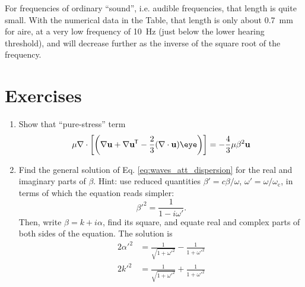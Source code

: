 For frequencies of ordinary ``sound'', i.e. audible frequencies, that
length is quite small. With the numerical data in the Table, that
length is only about \SI{0.7}{\milli\meter} for aire, at a very low
frequency of \SI{10}{\hertz} (just below the lower hearing threshold),
and will decrease further as the inverse of the square root of the
frequency.



\section{Exercises}
\begin{enumerate}
\item  \label{ex:div_of_traceless} Show that ``pure-stress'' term
  \[
   \mu \nabla \cdot \left[ \left(
        \nabla\bfu + \nabla\bfu\tran  - \frac23 (\divu)  \eye
      \right)
    \right] = -\frac43 \mu \beta^2 \bfu
  \]

\item Find the general solution of Eq. \ref{eq:waves_att_dispersion}
  for the real and imaginary parts of $\beta$. Hint: use reduced
  quantities $\beta'= c\beta/\omega $,
  $\omega'=\omega/\omega_\mathrm{c}$, in terms of which the equation
  reads simpler:
  \[
    \beta'^2 = \frac{1}{1-i \omega'} .
  \]
  Then, write $\beta=k+i \alpha$, find its square, and equate real and
  complex parts of both sides of the equation.
  The solution is
  \[
    \begin{align}
      2\alpha'^2 &=\frac {1}{\sqrt{1+\omega'^{2}}} - \frac {1}{1+\omega'^{2}} \\
      2k'^2     &=\frac {1}{\sqrt{1+\omega'^{2}}} + \frac {1}{1+\omega'^{2}}
    \end{align}
  \]
  
\end{enumerate}